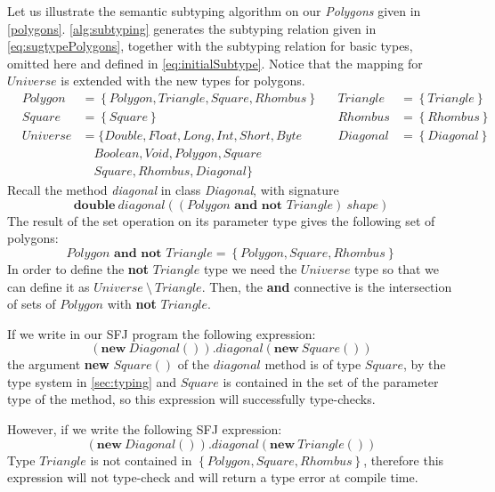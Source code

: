 \documentclass[runningheads]{llncs}
\begin{document}
Let us illustrate the semantic subtyping algorithm on our \emph{Polygons} given in \autoref{polygons}.
\autoref{alg:subtyping} generates the subtyping relation given in \autoref{eq:sugtypePolygons}, together with the subtyping relation for basic types, omitted here and defined in \autoref{eq:initialSubtype}. Notice that the mapping for $Universe$ is extended with the new types for polygons.
\begin{equation}
    \label{eq:sugtypePolygons}
    \begin{array}{llllll}
         & Polygon  & = \left\{Polygon, Triangle, Square, Rhombus \right\} &  & Triangle & = \left\{Triangle\right\}           \\
         & Square   & = \left\{Square\right\}                              &  & Rhombus  & = \left\{Rhombus\right\}            \\
         & Universe & = \{Double, Float, Long, Int, Short, Byte                                                              &  & Diagonal & = \left\{Diagonal\right\}          \\
         &          & \quad Boolean, Void, Polygon, Square                                                                     \\
         &          & \quad Square, Rhombus, Diagonal\}
    \end{array}
\end{equation}
%
Recall the method \emph{diagonal} in class \emph{Diagonal}, with signature
$$
\mathbf{double}\ diagonal((\textit{Polygon} \textbf{ and not }  \textit{Triangle}) \ shape)
$$
The result of the set operation on its parameter type gives the following set of polygons:
$$
Polygon \textbf{ and not } Triangle = \left\{Polygon, Square, Rhombus \right\}
$$
In order to define the \textbf{not} $Triangle$ type we need the $Universe$ type so that we can define it as $Universe\ \mathbf{\setminus}\ Triangle$. Then, the \textbf{and} connective is the intersection of sets of $Polygon$ with \textbf{not} $Triangle$.

If we write in our SFJ program the following expression:
$$
    (\textbf{new}\ Diagonal()).diagonal(\textbf{new}\ Square())
$$
the argument \textbf{new} $Square()$ of the $diagonal$ method is of type $Square$, by the type system in \autoref{sec:typing} and $Square$ is contained in the set of the parameter type of the method, so this expression will successfully type-checks.

However, if we write the following SFJ expression:
$$
    (\textbf{new}\ Diagonal()).diagonal(\textbf{new}\ Triangle())
$$
Type $Triangle$ is not contained in $\left\{Polygon, Square, Rhombus \right\}$, therefore this expression will not type-check and will return a type error at compile time.
\end{document}
